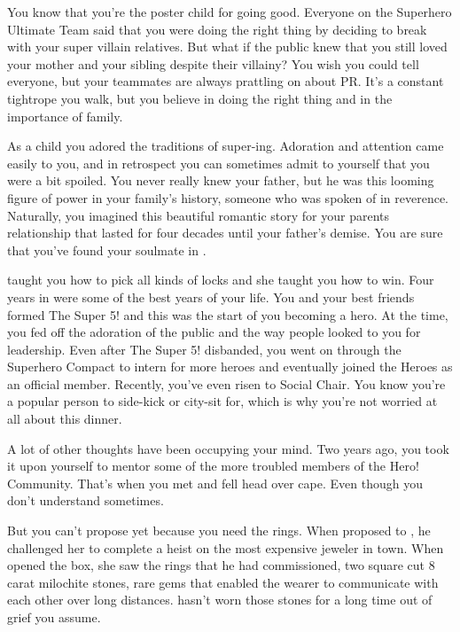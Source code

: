 \documentclass[char]{LRSguildcamp1}
\begin{document}
\name{\cYoungest{}}

You know that you’re the poster child for going good.  Everyone on the Superhero Ultimate Team said that you were doing the right thing by deciding to break with your super villain relatives. But what if the public knew that you still loved your mother and your sibling despite their villainy? You wish you could tell everyone, but your teammates are always prattling on about PR.  It's a constant tightrope you walk, but you believe in doing the right thing and in the importance of family. 

As a child you adored the traditions of super-ing. Adoration and attention came easily to you, and in retrospect you can sometimes admit to yourself that you were a bit spoiled. You never really knew your father, but he was this looming figure of power in your family's history, someone who was spoken of in reverence. Naturally, you imagined this beautiful romantic story for your parents relationship that lasted for four decades until your father's demise. You are sure that you've found your soulmate in \cYS{}. 

\cGrandma{} taught you how to pick all kinds of locks and she taught you how to win. Four years in \pSuperSchool{} were some of the best years  of your life. You and your best friends formed The Super 5! and this was the start of you becoming a hero. At the time, you fed off the adoration of the public and the way people looked to you for leadership. Even after The Super 5! disbanded, you went on through the Superhero Compact to intern for more heroes and eventually joined the Heroes as an official member. Recently, you've even risen to Social Chair.  You know you're a popular person to side-kick or city-sit for, which is why you're not worried at all about this dinner. 

A lot of other thoughts have been occupying your mind. Two years ago, you took it upon yourself to mentor some of the more troubled members of the Hero! Community. That's when you met \cYS{} and fell head over cape.  Even though you don't understand \cYS{} sometimes.  

But you can't propose yet because you need the rings. When \cGS{} proposed to \cGrandma{}, he challenged her to complete a heist on the most expensive jeweler in town. When \cGrandma{} opened the box, she saw the rings that he had commissioned, two square cut 8 carat milochite stones, rare gems that enabled the wearer to communicate with each other over long distances.  \cGrandma{} hasn't worn those stones for a long time out of grief you assume. 
\end{document}

